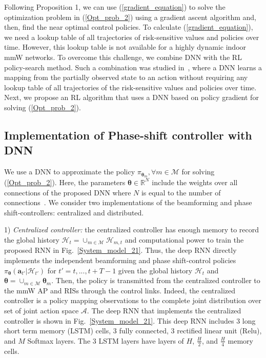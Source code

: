 \documentclass[conference]{IEEEtran}
\begin{document}
Following Proposition 1, we can use (\ref{gradient_equation}) to solve the optimization problem in (\ref{Opt_prob_2}) using a gradient ascent algorithm and, then, find the near optimal control policies. To calculate (\ref{gradient_equation}), we need a lookup table of all trajectories of risk-sensitive values and policies over time. However, this lookup table is not available for a highly dynamic indoor mmW networks. To overcome this challenge, we combine DNN with the RL policy-search method. Such a combination was studied in~\cite{three}, where a DNN learns a mapping from the partially observed state to an action without requiring any lookup table of all trajectories of the risk-sensitive values and policies over time. Next, we propose an RL algorithm that uses a DNN based on policy gradient for solving (\ref{Opt_prob_2}).
\vspace{-0.4cm}
\subsection{Implementation of Phase-shift controller with DNN}\label{Sec:Algorithm_A}
We use a DNN to approximate the policy $\pi_{\boldsymbol{\theta}_{m}},\forall m \in \mathcal{M}$ for solving (\ref{Opt_prob_2}). Here, the parameters $\boldsymbol{\theta} \in \mathbb{R}^{N}$ include the weights over all connections of the proposed DNN where $N$ is equal to the number of connections~\cite{three}. We consider two implementations of the beamforming and phase shift-controllers: centralized and distributed.

1) \emph{Centralized controller:}
the centralized controller has enough memory to record the global history $\mathcal{H}_t=\cup_{m \in \mathcal{M}} \mathcal{H}_{m,t}$ and computational power to train the proposed RNN in Fig.~\ref{System_model_21}. Thus, the deep RNN directly implements the independent beamforming and phase shift-control policies $\pi_{\boldsymbol{\theta}}(\boldsymbol{a}_{t'}|\mathcal{H}_{t'})$ for $t'=t,...,t+T-1$ given the global history $\mathcal{H}_t$ and $\boldsymbol{\theta}=\cup_{m \in \mathcal{M}}\boldsymbol{\theta}_m$. Then, the policy is transmitted from the centralized controller to the mmW AP and RISs through the control links. Indeed, the centralized controller is a policy mapping observations to the complete joint distribution over set of joint action space $\mathcal{A}$. The deep RNN that implements the centralized controller is shown in Fig.~\ref{System_model_21}. This deep RNN includes 3 long short term memory (LSTM) cells, 3 fully connected, 3 rectified linear unit (Relu), and $M$ Softmax layers. The 3 LSTM layers have layers of $H$, $\frac{H}{2}$, and $\frac{H}{4}$ memory cells.
\end{document}
